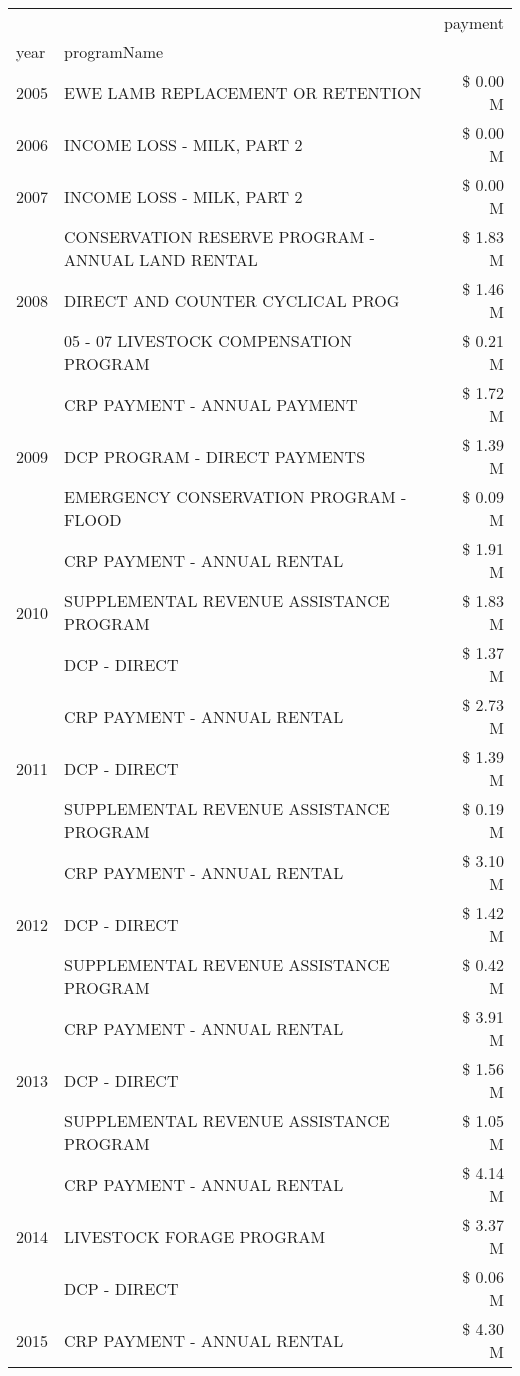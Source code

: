 \begin{tabular}{llr}
\toprule
 &  & payment \\
year & programName &  \\
\midrule
2005 & EWE LAMB REPLACEMENT OR RETENTION & \$ 0.00 M \\
\cline{1-3}
2006 & INCOME LOSS - MILK, PART 2 & \$ 0.00 M \\
\cline{1-3}
2007 & INCOME LOSS - MILK, PART 2 & \$ 0.00 M \\
\cline{1-3}
\multirow[t]{3}{*}{2008} & CONSERVATION RESERVE PROGRAM - ANNUAL LAND RENTAL & \$ 1.83 M \\
 & DIRECT AND COUNTER CYCLICAL PROG & \$ 1.46 M \\
 & 05 - 07 LIVESTOCK COMPENSATION PROGRAM & \$ 0.21 M \\
\cline{1-3}
\multirow[t]{3}{*}{2009} & CRP PAYMENT - ANNUAL PAYMENT & \$ 1.72 M \\
 & DCP PROGRAM - DIRECT PAYMENTS & \$ 1.39 M \\
 & EMERGENCY CONSERVATION PROGRAM - FLOOD & \$ 0.09 M \\
\cline{1-3}
\multirow[t]{3}{*}{2010} & CRP PAYMENT - ANNUAL RENTAL & \$ 1.91 M \\
 & SUPPLEMENTAL REVENUE ASSISTANCE PROGRAM & \$ 1.83 M \\
 & DCP - DIRECT & \$ 1.37 M \\
\cline{1-3}
\multirow[t]{3}{*}{2011} & CRP PAYMENT - ANNUAL RENTAL & \$ 2.73 M \\
 & DCP - DIRECT & \$ 1.39 M \\
 & SUPPLEMENTAL REVENUE ASSISTANCE PROGRAM & \$ 0.19 M \\
\cline{1-3}
\multirow[t]{3}{*}{2012} & CRP PAYMENT - ANNUAL RENTAL & \$ 3.10 M \\
 & DCP - DIRECT & \$ 1.42 M \\
 & SUPPLEMENTAL REVENUE ASSISTANCE PROGRAM & \$ 0.42 M \\
\cline{1-3}
\multirow[t]{3}{*}{2013} & CRP PAYMENT - ANNUAL RENTAL & \$ 3.91 M \\
 & DCP - DIRECT & \$ 1.56 M \\
 & SUPPLEMENTAL REVENUE ASSISTANCE PROGRAM & \$ 1.05 M \\
\cline{1-3}
\multirow[t]{3}{*}{2014} & CRP PAYMENT - ANNUAL RENTAL & \$ 4.14 M \\
 & LIVESTOCK FORAGE PROGRAM & \$ 3.37 M \\
 & DCP - DIRECT & \$ 0.06 M \\
\cline{1-3}
\multirow[t]{3}{*}{2015} & CRP PAYMENT - ANNUAL RENTAL & \$ 4.30 M \\

\end{tabular}
